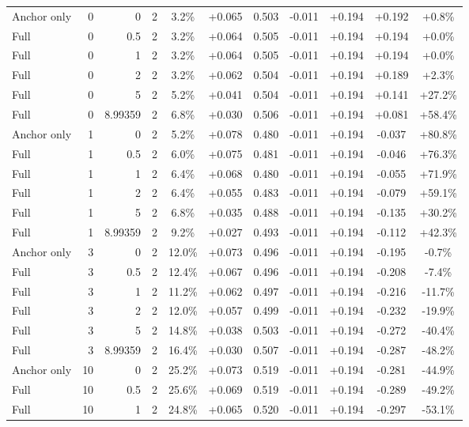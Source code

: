 \begin{table}[htbp]
\begin{tabular}{lrrrccccccc}
Anchor only & 0 & 0 & 2 & 3.2\% & +0.065 & 0.503 & -0.011 & +0.194 & +0.192 & +0.8\% \\
Full & 0 & 0.5 & 2 & 3.2\% & +0.064 & 0.505 & -0.011 & +0.194 & +0.194 & +0.0\% \\
Full & 0 & 1 & 2 & 3.2\% & +0.064 & 0.505 & -0.011 & +0.194 & +0.194 & +0.0\% \\
Full & 0 & 2 & 2 & 3.2\% & +0.062 & 0.504 & -0.011 & +0.194 & +0.189 & +2.3\% \\
Full & 0 & 5 & 2 & 5.2\% & +0.041 & 0.504 & -0.011 & +0.194 & +0.141 & +27.2\% \\
Full & 0 & 8.99359 & 2 & 6.8\% & +0.030 & 0.506 & -0.011 & +0.194 & +0.081 & +58.4\% \\
Anchor only & 1 & 0 & 2 & 5.2\% & +0.078 & 0.480 & -0.011 & +0.194 & -0.037 & +80.8\% \\
Full & 1 & 0.5 & 2 & 6.0\% & +0.075 & 0.481 & -0.011 & +0.194 & -0.046 & +76.3\% \\
Full & 1 & 1 & 2 & 6.4\% & +0.068 & 0.480 & -0.011 & +0.194 & -0.055 & +71.9\% \\
Full & 1 & 2 & 2 & 6.4\% & +0.055 & 0.483 & -0.011 & +0.194 & -0.079 & +59.1\% \\
Full & 1 & 5 & 2 & 6.8\% & +0.035 & 0.488 & -0.011 & +0.194 & -0.135 & +30.2\% \\
Full & 1 & 8.99359 & 2 & 9.2\% & +0.027 & 0.493 & -0.011 & +0.194 & -0.112 & +42.3\% \\
Anchor only & 3 & 0 & 2 & 12.0\% & +0.073 & 0.496 & -0.011 & +0.194 & -0.195 & -0.7\% \\
Full & 3 & 0.5 & 2 & 12.4\% & +0.067 & 0.496 & -0.011 & +0.194 & -0.208 & -7.4\% \\
Full & 3 & 1 & 2 & 11.2\% & +0.062 & 0.497 & -0.011 & +0.194 & -0.216 & -11.7\% \\
Full & 3 & 2 & 2 & 12.0\% & +0.057 & 0.499 & -0.011 & +0.194 & -0.232 & -19.9\% \\
Full & 3 & 5 & 2 & 14.8\% & +0.038 & 0.503 & -0.011 & +0.194 & -0.272 & -40.4\% \\
Full & 3 & 8.99359 & 2 & 16.4\% & +0.030 & 0.507 & -0.011 & +0.194 & -0.287 & -48.2\% \\
Anchor only & 10 & 0 & 2 & 25.2\% & +0.073 & 0.519 & -0.011 & +0.194 & -0.281 & -44.9\% \\
Full & 10 & 0.5 & 2 & 25.6\% & +0.069 & 0.519 & -0.011 & +0.194 & -0.289 & -49.2\% \\
Full & 10 & 1 & 2 & 24.8\% & +0.065 & 0.520 & -0.011 & +0.194 & -0.297 & -53.1\% \\

\end{tabular}
\end{table}
